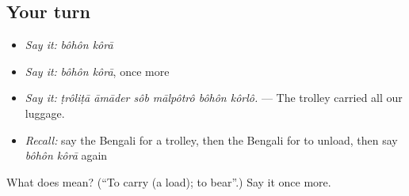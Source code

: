 \subsection*{Your turn}
\begin{itemize}
\raggedright
  \item \emph{Say it:} \emph{bôhôn kôrā}
  \item \emph{Say it:} \emph{bôhôn kôrā}, once more
  \item \emph{Say it:} \emph{ṭrôliṭā āmāder sôb mālpôtrô bôhôn kôrlô.} — The trolley carried all our luggage.
  \item \emph{Recall:} say the Bengali for a trolley, then the Bengali for to unload, then say \emph{bôhôn kôrā} again
\end{itemize}

\begin{tcolorbox}[breakable,colback=teal!4,colframe=teal!35!black,title={Before you move on}]
What does   mean? (\textquotedblleft{}To carry (a load); to bear\textquotedblright{}.) Say it once more.
\end{tcolorbox}
